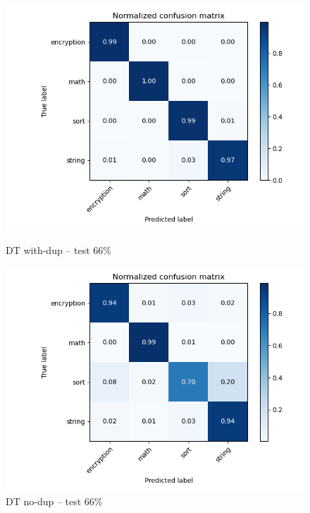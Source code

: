 \documentclass[11pt]{article}
\begin{document}
	\begin{figure}[H]
		\centering
		\begin{minipage}{.5\textwidth}
		  \centering
		  \includegraphics[width=\linewidth]{assets/tree_dup_0.66.png}
		  \caption{DT with-dup -- test 66\%}
		\end{minipage}%
		\begin{minipage}{.5\textwidth}
		  \centering
		  \includegraphics[width=\linewidth]{assets/tree_nodup_0.66.png}
		  \caption{DT no-dup -- test 66\%}
		\end{minipage}
	\end{figure}
\end{document}
